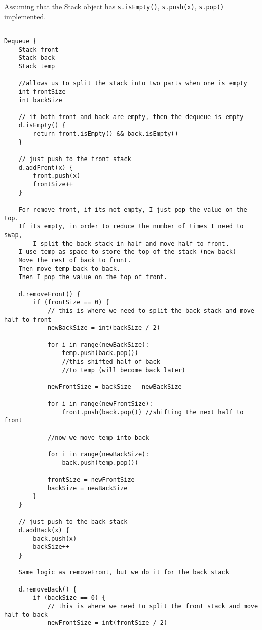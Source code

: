 \documentclass[11pt,largemargins]{homework}
\begin{document}
Assuming that the Stack object has \verb|s.isEmpty()|, \verb|s.push(x)|, \verb|s.pop()| implemented.

\begin{verbatim}

Dequeue {
    Stack front
    Stack back
    Stack temp

    //allows us to split the stack into two parts when one is empty
    int frontSize
    int backSize
        
    // if both front and back are empty, then the dequeue is empty
    d.isEmpty() {
        return front.isEmpty() && back.isEmpty()
    }

    // just push to the front stack
    d.addFront(x) {
        front.push(x)
        frontSize++
    }

    For remove front, if its not empty, I just pop the value on the top.
    If its empty, in order to reduce the number of times I need to swap, 
        I split the back stack in half and move half to front.
    I use temp as space to store the top of the stack (new back)
    Move the rest of back to front.
    Then move temp back to back.
    Then I pop the value on the top of front.

    d.removeFront() {
        if (frontSize == 0) {
            // this is where we need to split the back stack and move half to front
            newBackSize = int(backSize / 2)

            for i in range(newBackSize):
                temp.push(back.pop()) 
                //this shifted half of back
                //to temp (will become back later)
            
            newFrontSize = backSize - newBackSize

            for i in range(newFrontSize):
                front.push(back.pop()) //shifting the next half to front

            //now we move temp into back

            for i in range(newBackSize):
                back.push(temp.pop())

            frontSize = newFrontSize
            backSize = newBackSize
        }
    }
    
    // just push to the back stack
    d.addBack(x) {
        back.push(x)
        backSize++
    }

    Same logic as removeFront, but we do it for the back stack

    d.removeBack() {
        if (backSize == 0) {
            // this is where we need to split the front stack and move half to back
            newFrontSize = int(frontSize / 2)


\end{verbatim}
\end{document}

